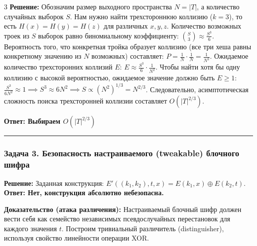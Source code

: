 ﻿\documentclass[9pt,a4paper,landscape]{extarticle}
\begin{document}
\begin{multicols*}{3}
\textbf{Решение:} Обозначим размер выходного пространства \(N = |T|\), а количество случайных выборок \(S\). Нам нужно найти трехстороннюю коллизию (\(k=3\)), то есть \(H(x) = H(y) = H(z)\) для различных \(x, y, z\). Количество возможных троек из \(S\) выборок равно биномиальному коэффициенту: \(\binom{S}{3} \approx \frac{S^3}{6}\). Вероятность того, что конкретная тройка образует коллизию (все три хеша равны конкретному значению из \(N\) возможных) составляет: \(P = \frac{1}{N} \cdot \frac{1}{N} = \frac{1}{N^2}\). Ожидаемое количество трехсторонних коллизий \(E\): \(E \approx \frac{S^3}{6} \cdot \frac{1}{N^2}\). Чтобы найти хотя бы одну коллизию с высокой вероятностью, ожидаемое значение должно быть \(E \ge 1\): \(\frac{S^3}{6N^2} \approx 1 \implies S^3 \approx 6N^2 \implies S \propto (N^2)^{1/3} = N^{2/3}\). Следовательно, асимптотическая сложность поиска трехсторонней коллизии составляет \(O(|T|^{2/3})\).

\textbf{Ответ: Выбираем \(O(|T|^{2/3})\)}

\begin{center}\rule{0.5\linewidth}{0.5pt}\end{center}

\subsubsection{Задача 3. Безопасность настраиваемого (tweakable) блочного шифра}\label{ux437ux430ux434ux430ux447ux430-3.-ux431ux435ux437ux43eux43fux430ux441ux43dux43eux441ux442ux44c-ux43dux430ux441ux442ux440ux430ux438ux432ux430ux435ux43cux43eux433ux43e-tweakable-ux431ux43bux43eux447ux43dux43eux433ux43e-ux448ux438ux444ux440ux430}

\textbf{Решение:} Заданная конструкция: \(E'((k_1,k_2), t, x) = E(k_1, x) \oplus E(k_2, t)\). \textbf{Ответ: Нет, конструкция абсолютно небезопасна.}

\textbf{Доказательство (атака различения):} Настраиваемый блочный шифр должен вести себя как семейство независимых псевдослучайных перестановок для каждого значения \(t\). Построим тривиальный различитель (distinguisher), используя свойство линейности операции XOR.


\end{multicols*}
\end{document}
